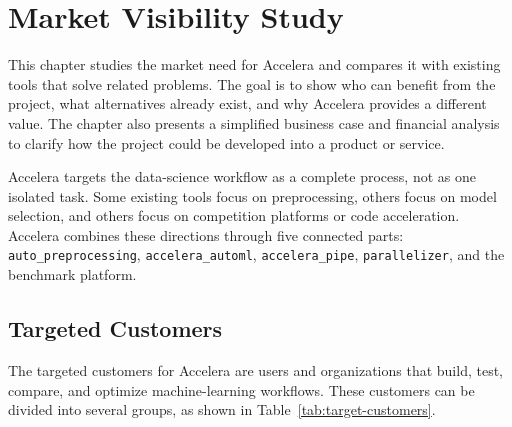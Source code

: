 \documentclass[12pt,a4paper]{report}
\begin{document}
\chapter{Market Visibility Study}
\label{chap:market-visibility}

This chapter studies the market need for Accelera and compares it with existing
tools that solve related problems. The goal is to show who can benefit from the
project, what alternatives already exist, and why Accelera provides a different
value. The chapter also presents a simplified business case and financial
analysis to clarify how the project could be developed into a product or service.

\medskip
\noindent Accelera targets the data-science workflow as a complete process, not as one
isolated task. Some existing tools focus on preprocessing, others focus on model
selection, and others focus on competition platforms or code acceleration.
Accelera combines these directions through five connected parts:
\texttt{auto\_preprocessing}, \texttt{accelera\_automl},
\texttt{accelera\_pipe}, \texttt{parallelizer}, and the benchmark platform.

\section{Targeted Customers}

\medskip
\noindent The targeted customers for Accelera are users and organizations that build,
test, compare, and optimize machine-learning workflows. These customers can be
divided into several groups, as shown in Table~\ref{tab:target-customers}.
\end{document}
